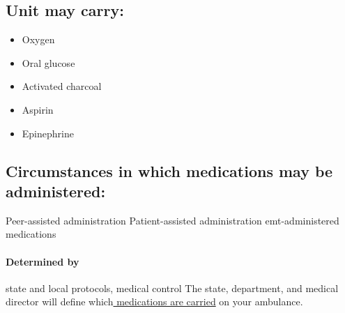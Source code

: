 \documentclass[../../EMT-169.tex]{subfiles}
\begin{document}
\subsection{Unit may carry:}
\begin{itemize}
	\item Oxygen
	\item Oral glucose
	\item Activated charcoal
	\item Aspirin
	\item Epinephrine
\end{itemize}

\subsection{Circumstances in which medications may be administered:}
\begin{outline}[enumerate]
	\1 Peer-assisted administration
	\1 Patient-assisted administration
	\1 \acrshort{emt}-administered medications
\end{outline}

\paragraph{Determined by} state and local protocols, medical control \newline
The state, department, and medical director will define which\underline{ medications are carried} on your ambulance. \hfill \\
\end{document}

